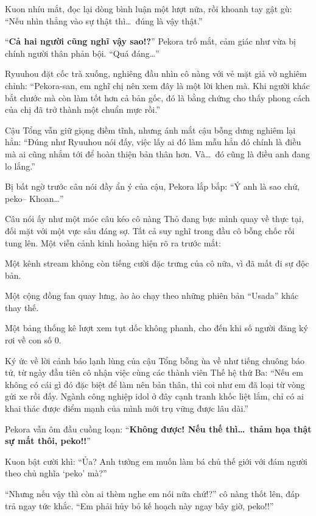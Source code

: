 \documentclass[../main.tex]{subfiles}
\begin{document}
Kuon nhíu mắt, đọc lại dòng bình luận một lượt nữa, rồi khoanh tay gật gù: ``Nếu nhìn thẳng vào sự thật thì\dots\ đúng là vậy thật.''

``\textbf{Cả hai người cũng nghĩ vậy sao!?}'' Pekora trố mắt, cảm giác như vừa bị chính người thân phản bội. ``Quá đáng\dots''

Ryuuhou đặt cốc trà xuống, nghiêng đầu nhìn cô nàng với vẻ mặt giả vờ nghiêm chỉnh: ``Pekora-san, em nghĩ chị nên xem đây là một lời khen mà. Khi người khác bắt chước mà còn làm tốt hơn cả bản gốc, đó là bằng chứng cho thấy phong cách của chị đã trở thành một chuẩn mực rồi.''

Cậu Tổng vẫn giữ giọng điềm tĩnh, nhưng ánh mắt cậu bỗng dưng nghiêm lại hẳn: ``Đúng như Ryuuhou nói đấy, việc lấy ai đó làm mẫu hẳn đó chính là điều mà ai cũng nhắm tới để hoàn thiện bản thân hơn. Và\dots\ đó cũng là điều anh đang lo lắng.''

Bị bất ngờ trước câu nói đầy ẩn ý của cậu, Pekora lắp bắp: ``Ý anh là sao chứ, peko-- Khoan\dots''

Câu nói ấy như một móc câu kéo cô nàng Thỏ đang bực mình quay về thực tại, đối mặt với một vực sâu đáng sợ. Tất cả suy nghĩ trong đầu cô bỗng chốc rối tung lên. Một viễn cảnh kinh hoàng hiện rõ ra trước mắt:

Một kênh stream không còn tiếng cười đặc trưng của cô nữa, vì đã mất đi sự độc bản.

Một cộng đồng fan quay lưng, ào ào chạy theo những phiên bản ``Usada'' khác thay thế.

Một bảng thống kê lượt xem tụt dốc không phanh, cho đến khi số người đăng ký rơi về con số 0.

Ký ức về lời cảnh báo lạnh lùng của cậu Tổng bỗng ùa về như tiếng chuông báo tử, từ ngày đầu tiên cô nhận việc cùng các thành viên Thế hệ thứ Ba: ``Nếu em không có cái gì đó đặc biệt để làm nên bản thân, thì coi như em đã loại từ vòng gửi xe rồi đấy. Ngành công nghiệp idol ở đây cạnh tranh khốc liệt lắm, chỉ có ai khai thác được điểm mạnh của mình mới trụ vững được lâu dài.''

Pekora vẫn ôm đầu cuồng loạn: ``\textbf{Không được! Nếu thế thì\dots\ thảm họa thật sự mất thôi, peko!!}''

Kuon bật cười khì: ``Ủa? Anh tưởng em muốn làm bá chủ thế giới với đám người theo chủ nghĩa `peko' mà?''

``Nhưng nếu vậy thì còn ai thèm nghe em nói nữa chứ!?'' cô nàng thốt lên, đáp trả ngay tức khắc. ``Em phải hủy bỏ kế hoạch này ngay bây giờ, peko!!''
\end{document}
